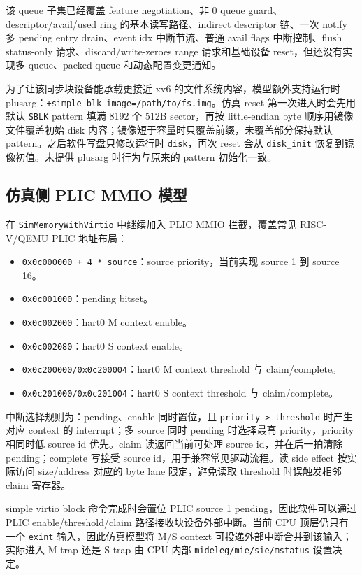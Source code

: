 \documentclass[UTF8,a4paper,11pt]{ctexart}
\begin{document}
该 queue 子集已经覆盖 feature negotiation、非 0 queue guard、descriptor/avail/used ring 的基本读写路径、indirect descriptor 链、一次 notify 多 pending entry drain、event idx 中断节流、普通 avail flags 中断控制、flush status-only 请求、discard/write-zeroes range 请求和基础设备 reset，但还没有实现多 queue、packed queue 和动态配置变更通知。

为了让该同步块设备能承载更接近 xv6 的文件系统内容，模型额外支持运行时 plusarg：\texttt{+simple\_blk\_image=/path/to/fs.img}。仿真 reset 第一次进入时会先用默认 \texttt{SBLK} pattern 填满 8192 个 512B sector，再按 little-endian byte 顺序用镜像文件覆盖初始 disk 内容；镜像短于容量时只覆盖前缀，未覆盖部分保持默认 pattern。之后软件写盘只修改运行时 \texttt{disk}，再次 reset 会从 \texttt{disk\_init} 恢复到镜像初值。未提供 plusarg 时行为与原来的 pattern 初始化一致。

\subsection{仿真侧 PLIC MMIO 模型}

在 \texttt{SimMemoryWithVirtio} 中继续加入 PLIC MMIO 拦截，覆盖常见 RISC-V/QEMU PLIC 地址布局：

\begin{itemize}
  \item \texttt{0x0c000000 + 4 * source}：source priority，当前实现 source 1 到 source 16。
  \item \texttt{0x0c001000}：pending bitset。
  \item \texttt{0x0c002000}：hart0 M context enable。
  \item \texttt{0x0c002080}：hart0 S context enable。
  \item \texttt{0x0c200000/0x0c200004}：hart0 M context threshold 与 claim/complete。
  \item \texttt{0x0c201000/0x0c201004}：hart0 S context threshold 与 claim/complete。
\end{itemize}

中断选择规则为：pending、enable 同时置位，且 \texttt{priority > threshold} 时产生对应 context 的 interrupt；多 source 同时 pending 时选择最高 priority，priority 相同时低 source id 优先。claim 读返回当前可处理 source id，并在后一拍清除 pending；complete 写接受 source id，用于兼容常见驱动流程。读 side effect 按实际访问 size/address 对应的 byte lane 限定，避免读取 threshold 时误触发相邻 claim 寄存器。

simple virtio block 命令完成时会置位 PLIC source 1 pending，因此软件可以通过 PLIC enable/threshold/claim 路径接收块设备外部中断。当前 CPU 顶层仍只有一个 \texttt{exint} 输入，因此仿真模型将 M/S context 可投递外部中断合并到该输入；实际进入 M trap 还是 S trap 由 CPU 内部 \texttt{mideleg/mie/sie/mstatus} 设置决定。
\end{document}
